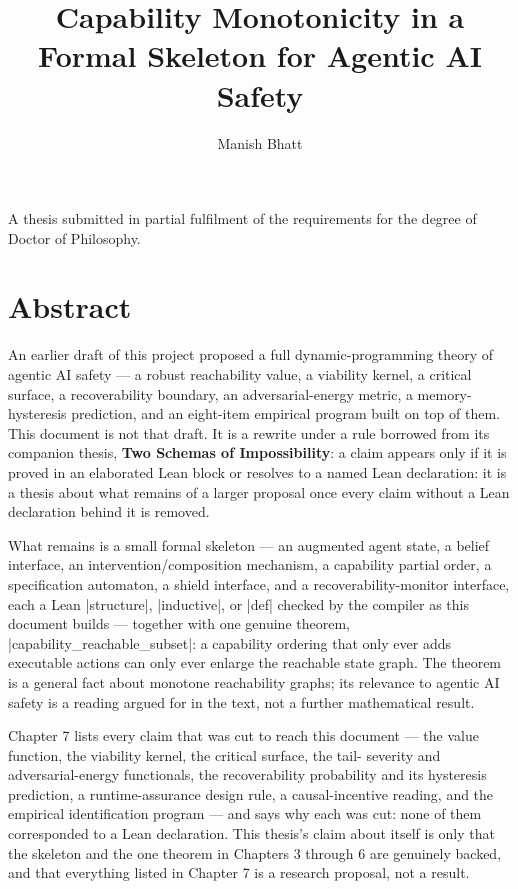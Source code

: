 \documentclass{memoir}
\title{\sffamily Capability Monotonicity in a Formal Skeleton for Agentic AI Safety}
\author{\sffamily Manish Bhatt}
\date{\sffamily }
\begin{document}
\frontmatter

\begin{titlingpage}
\maketitle
\end{titlingpage}

\tableofcontents


\cleardoublepage
A thesis submitted in partial fulfilment of the requirements for the degree of
Doctor of Philosophy.

\mainmatter
\chapter{Abstract}\label{Capability--Monotonicity--in--a--Formal--Skeleton--for--Agentic--AI--Safety----Abstract}

An earlier draft of this project proposed a full dynamic-programming theory
of agentic AI safety — a robust reachability value, a viability kernel, a
critical surface, a recoverability boundary, an adversarial-energy metric,
a memory-hysteresis prediction, and an eight-item empirical program built
on top of them. This document is not that draft. It is a rewrite under a
rule borrowed from its companion thesis, \textbf{Two Schemas of Impossibility}:
a claim appears only if it is proved in an elaborated Lean block or
resolves to a named Lean declaration: it is a thesis about what remains of
a larger proposal once every claim without a Lean declaration behind it is
removed.

What remains is a small formal skeleton — an augmented agent state, a
belief interface, an intervention/composition mechanism, a capability
partial order, a specification automaton, a shield interface, and a
recoverability-monitor interface, each a Lean \LeanVerb|structure|, \LeanVerb|inductive|, or
\LeanVerb|def| checked by the compiler as this document builds — together with one
genuine theorem, \LeanVerb|capability_reachable_subset|: a capability ordering that
only ever adds executable actions can only ever enlarge the reachable
state graph. The theorem is a general fact about monotone reachability
graphs; its relevance to agentic AI safety is a reading argued for in the
text, not a further mathematical result.

Chapter 7 lists every claim that was cut to reach this document — the
value function, the viability kernel, the critical surface, the tail-
severity and adversarial-energy functionals, the recoverability
probability and its hysteresis prediction, a runtime-assurance design
rule, a causal-incentive reading, and the empirical identification
program — and says why each was cut: none of them corresponded to a Lean
declaration. This thesis's claim about itself is only that the skeleton
and the one theorem in Chapters 3 through 6 are genuinely backed, and that
everything listed in Chapter 7 is a research proposal, not a result.
\end{document}
